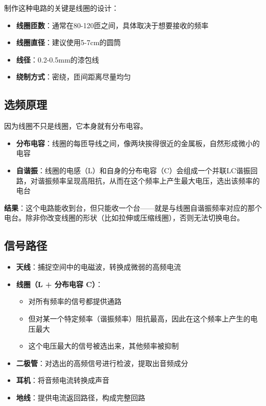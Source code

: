 \documentclass[12pt,UTF8]{ctexbook}
\begin{document}
制作这种电路的关键是线圈的设计：
\begin{itemize}[leftmargin=3.5em]
	\item \textbf{线圈匝数}：通常在80-120匝之间，具体取决于想要接收的频率
	\item \textbf{线圈直径}：建议使用5-7cm的圆筒
	\item \textbf{线径}：0.2-0.5mm的漆包线
	\item \textbf{绕制方式}：密绕，匝间距离尽量均匀
\end{itemize}

\subsection{选频原理}

因为线圈不只是线圈，它本身就有分布电容。
\begin{itemize}[leftmargin=3.5em]
	\item \textbf{分布电容}：线圈的每匝导线之间，像两块挨得很近的金属板，自然形成微小的电容
	\item \textbf{自谐振}：线圈的电感（L）和自身的分布电容（C）会组成一个并联LC谐振回路，对谐振频率呈现高阻抗，从而在这个频率上产生最大电压，选出该频率的电台
\end{itemize}

\textbf{结果}：这个电路能收到台，但只能收一个台——就是与线圈自谐振频率对应的那个电台。除非你改变线圈的形状（比如拉伸或压缩线圈），否则无法切换电台。

\subsection{信号路径}

\begin{itemize}[leftmargin=3.5em]
	\item \textbf{天线}：捕捉空间中的电磁波，转换成微弱的高频电流
	\item \textbf{线圈（L + 分布电容 C）}：
	\begin{itemize}[leftmargin=3.5em]
		\item 对所有频率的信号都提供通路
		\item 但对某一个特定频率（谐振频率）阻抗最高，因此在这个频率上产生的电压最大
		\item 这个电压最大的信号被选出来，其他频率被抑制
	\end{itemize}
	\item \textbf{二极管}：对选出的高频信号进行检波，提取出音频成分
	\item \textbf{耳机}：将音频电流转换成声音
	\item \textbf{地线}：提供电流返回路径，构成完整回路
\end{itemize}
\end{document}
